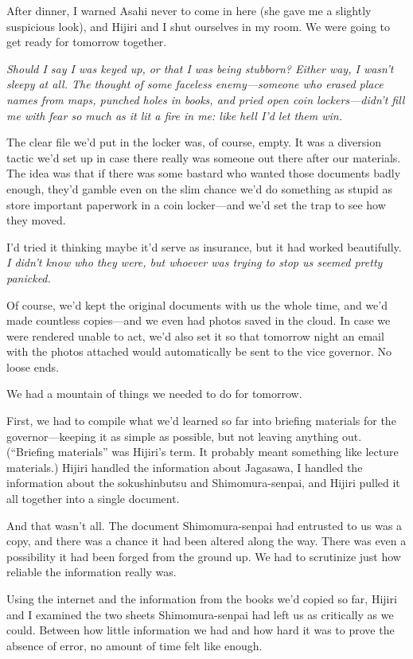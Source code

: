 \documentclass[
    a4paper,
    12pt,
    twoside,
    openany,
    UTF8,
    fontset=windows
]{ctexbook}
\begin{document}
After dinner, I warned Asahi never to come in here (she gave me a slightly suspicious look), and Hijiri and I shut ourselves in my room. We were going to get ready for tomorrow together.

\textit{Should I say I was keyed up, or that I was being stubborn? Either way, I wasn't sleepy at all. The thought of some faceless enemy---someone who erased place names from maps, punched holes in books, and pried open coin lockers---didn't fill me with fear so much as it lit a fire in me: like hell I'd let them win.}

The clear file we'd put in the locker was, of course, empty. It was a diversion tactic we'd set up in case there really was someone out there after our materials. The idea was that if there was some bastard who wanted those documents badly enough, they'd gamble even on the slim chance we'd do something as stupid as store important paperwork in a coin locker---and we'd set the trap to see how they moved.

I'd tried it thinking maybe it'd serve as insurance, but it had worked beautifully. \textit{I didn't know who they were, but whoever was trying to stop us seemed pretty panicked.}

Of course, we'd kept the original documents with us the whole time, and we'd made countless copies---and we even had photos saved in the cloud. In case we were rendered unable to act, we'd also set it so that tomorrow night an email with the photos attached would automatically be sent to the vice governor. No loose ends.

We had a mountain of things we needed to do for tomorrow.

First, we had to compile what we'd learned so far into briefing materials for the governor---keeping it as simple as possible, but not leaving anything out. (``Briefing materials'' was Hijiri's term. It probably meant something like lecture materials.) Hijiri handled the information about Jagasawa, I handled the information about the sokushinbutsu and Shimomura-senpai, and Hijiri pulled it all together into a single document.

And that wasn't all. The document Shimomura-senpai had entrusted to us was a copy, and there was a chance it had been altered along the way. There was even a possibility it had been forged from the ground up. We had to scrutinize just how reliable the information really was.

Using the internet and the information from the books we'd copied so far, Hijiri and I examined the two sheets Shimomura-senpai had left us as critically as we could. Between how little information we had and how hard it was to prove the absence of error, no amount of time felt like enough.
\end{document}
